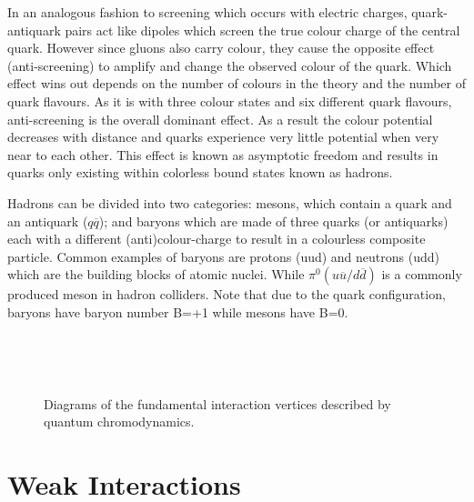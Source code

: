 In an analogous fashion to screening which occurs with electric charges, quark-antiquark pairs act like dipoles which screen the true colour charge of the central quark. However since gluons also carry colour, they cause the opposite effect (anti-screening) to amplify and change the observed colour of the quark. Which effect wins out depends on the number of colours in the theory and the number of quark flavours. As it is with three colour states and six different quark flavours, anti-screening is the overall dominant effect. As a result the colour potential decreases with distance and quarks experience very little potential when very near to each other. This effect is known as asymptotic freedom and results in quarks only existing within colorless bound states known as hadrons.

Hadrons can be divided into two categories: mesons, which contain a quark and an antiquark ($q\overline{q}$); and baryons which are made of three quarks (or antiquarks) each with a different (anti)colour-charge to result in a colourless composite particle. Common examples of baryons are protons (uud) and neutrons (udd) which are the building blocks of atomic nuclei. While $\pi^{0} (u\overline{u}/d\overline{d})$ is a commonly produced meson in hadron colliders. Note that due to the quark configuration, baryons have baryon number B=+1 while mesons have B=0.
  
\begin{figure}
  \begin{minipage}[][][t]{.32\textwidth}
    
     \label{fig:TheoryQCDColour}
  \end{minipage}
  \,
  \begin{minipage}[][][t]{.32\textwidth}
    \centering
    
     \label{fig:TheoryQCDFourGluon}
  \end{minipage}
  \,
  \begin{minipage}[][][t]{.32\textwidth}
    \centering
    
     \label{fig:TheoryQCDThreeGluon}
  \end{minipage}
  \caption{Diagrams of the fundamental interaction vertices described by quantum chromodynamics.} \label{fig:TheoryQCDVertexes}
\end{figure}

\section{Weak Interactions}

